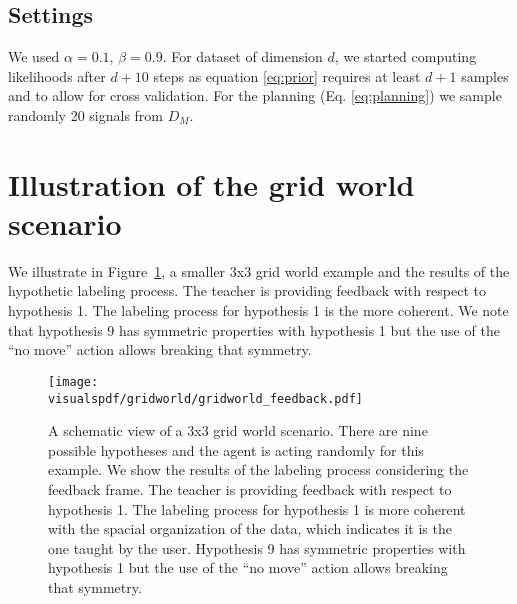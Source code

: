 \subsection{Settings}

We used $\alpha = 0.1$, $\beta = 0.9$. For dataset of dimension $d$, we started computing likelihoods after $d+10$ steps as equation \ref{eq:prior} requires at least $d+1$ samples and to allow for cross validation. For the planning (Eq. \ref{eq:planning}) we sample randomly 20 signals from $D_M$.

\section{Illustration of the grid world scenario}
\label{chapter:planning:gridworld}

We illustrate in Figure~\ref{fig:planning:gridworldfeedback}, a smaller 3x3 grid world example and the results of the hypothetic labeling process. The teacher is providing feedback with respect to hypothesis 1. The labeling process for hypothesis 1 is the more coherent. We note that hypothesis 9 has symmetric properties with hypothesis 1 but the use of the ``no move'' action allows breaking that symmetry.

\begin{figure}[!htbp]
  \centering
  \texttt{[image: \\visualspdf/gridworld/gridworld\_feedback.pdf]}
  \caption{A schematic view of a 3x3 grid world scenario. There are nine possible hypotheses and the agent is acting randomly for this example. We show the results of the labeling process considering the feedback frame. The teacher is providing feedback with respect to hypothesis 1. The labeling process for hypothesis 1 is more coherent with the spacial organization of the data, which indicates it is the one taught by the user. Hypothesis 9 has symmetric properties with hypothesis 1 but the use of the ``no move'' action allows breaking that symmetry.}
  \label{fig:planning:gridworldfeedback}
\end{figure}

\newpage

